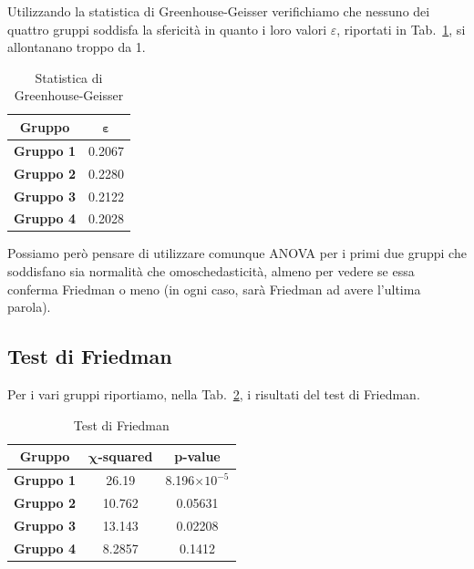 \documentclass[conference]{IEEEtran}
\begin{document}
Utilizzando la statistica di Greenhouse-Geisser verifichiamo che nessuno dei quattro gruppi
soddisfa la sfericità in quanto i loro valori $\varepsilon$, riportati in Tab.~\ref{tab4},
si allontanano troppo da 1.
\begin{table}[htbp]
    \caption{Statistica di Greenhouse-Geisser}
    \begin{center}
    \begin{tabular}{|c|c|}
    \hline
    \textbf{Gruppo} & $\boldsymbol{\varepsilon}$\\
    \hline
    \textbf{Gruppo 1} & 0.2067 \\\cline{1-2}
    \textbf{Gruppo 2} & 0.2280 \\\cline{1-2}
    \textbf{Gruppo 3} & 0.2122 \\\cline{1-2}
    \textbf{Gruppo 4} & 0.2028 \\\cline{1-2}
    \hline
    \end{tabular}
    \label{tab4}
    \end{center}
\end{table}
Possiamo però pensare di utilizzare comunque ANOVA per i primi due gruppi
che soddisfano sia normalità che omoschedasticità, almeno per vedere
se essa conferma Friedman o meno (in ogni caso, sarà Friedman ad avere l'ultima parola).

\subsection{Test di Friedman}

Per i vari gruppi riportiamo, nella Tab.~\ref{tab5}, i risultati del test di Friedman.
\begin{table}[htbp]
    \caption{Test di Friedman}
    \begin{center}
    \begin{tabular}{|c|c|c|}
    \hline
    \textbf{Gruppo} & $\boldsymbol{\chi}$\textbf{-squared} & \textbf{p-value} \\
    \hline
    \textbf{Gruppo 1} & 26.19 & 8.196$\times 10^{-5}$ \\\cline{1-3}
    \textbf{Gruppo 2} & 10.762 & 0.05631 \\\cline{1-3}
    \textbf{Gruppo 3} & 13.143 & 0.02208 \\\cline{1-3}
    \textbf{Gruppo 4} & 8.2857 & 0.1412 \\\cline{1-3}
    \hline
    \end{tabular}
    \label{tab5}
    \end{center}
\end{table}
\end{document}
